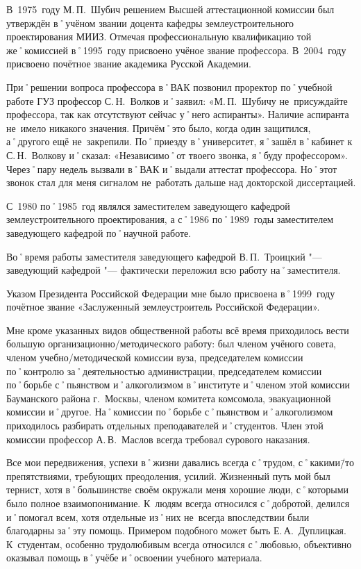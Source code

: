 В~1975~году М.\,П.~Шубич решением Высшей аттестационной комиссии был утверждён в˚учёном звании доцента кафедры землеустроительного проектирования МИИЗ. Отмечая профессиональную квалификацию той же˚комиссией в˚1995~году присвоено учёное звание профессора. В~2004~году присвоено почётное звание академика Русской Академии.

При˚решении вопроса профессора в˚ВАК позвонил проректор по˚учебной работе ГУЗ профессор С.\,Н.~Волков и˚заявил: «М.\,П.~Шубичу не~присуждайте профессора, так как отсутствуют сейчас у˚него аспиранты». Наличие аспиранта не~имело никакого значения. Причём˚это было, когда один защитился, а˚другого ещё не~закрепили. По˚приезду в˚университет, я˚зашёл в˚кабинет к С.\,Н.~Волкову и˚сказал: «Независимо˚от твоего звонка, я˚буду профессором». Через˚пару недель вызвали в˚ВАК и˚выдали аттестат профессора. Но˚этот звонок стал для меня сигналом не~работать дальше над докторской диссертацией.

С~1980 по˚1985~год являлся заместителем заведующего кафедрой землеустроительного проектирования, а с˚1986 по˚1989~годы заместителем заведующего кафедрой по˚научной работе.

Во˚время работы заместителя заведующего кафедрой В.\,П.~Троицкий "--- заведующий кафедрой "--- фактически переложил всю работу на˚заместителя.

Указом Президента Российской Федерации мне было присвоена в˚1999~году почётное звание «Заслуженный землеустроитель Российской Федерации». 

Мне кроме указанных видов общественной работы всё время приходилось вести большую организационно\-/методического работу: был членом учёного совета, членом учебно\-/методической комиссии вуза, председателем комиссии по˚контролю за˚деятельностью администрации, председателем комиссии по˚борьбе с˚пьянством и˚алкоголизмом в˚институте и˚членом этой комиссии Бауманского района г.~Москвы, членом комитета комсомола, эвакуационной комиссии и˚другое. На˚комиссии по˚борьбе с˚пьянством и˚алкоголизмом приходилось разбирать отдельных преподавателей и˚студентов. Член этой комиссии профессор А.\,В.~Маслов всегда требовал сурового наказания.

Все мои передвижения, успехи в˚жизни давались всегда с˚трудом, с˚какими\=/то препятствиями, требующих преодоления, усилий. Жизненный путь мой был тернист, хотя в˚большинстве своём окружали меня хорошие люди, с˚которыми было полное взаимопонимание. К~людям всегда относился с˚добротой, делился и˚помогал всем, хотя отдельные из˚них не~всегда впоследствии были благодарны за˚эту помощь. Примером подобного может быть Е.\,А.~Дуплицкая. К~студентам, особенно трудолюбивым всегда относился с˚любовью, объективно оказывал помощь в˚учёбе и˚освоении учебного материала.

